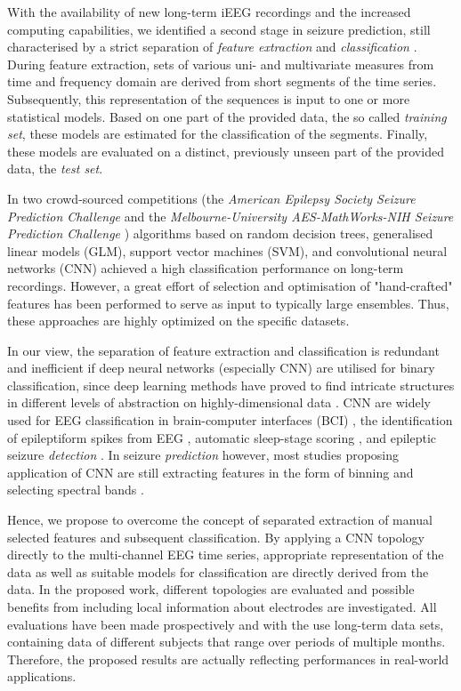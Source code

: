 \documentclass[a4paper, conference]{IEEEtran}
\begin{document}
With the availability of new long-term iEEG recordings and the increased computing capabilities, we identified a second stage in seizure prediction, still characterised by a strict separation of \textit{feature extraction} and \textit{classification} \cite{Howbert2014}. During feature extraction, sets of various uni- and multivariate measures from time and frequency domain are derived from short segments of the time series. Subsequently, this representation of the sequences is input to one or more statistical models. Based on one part of the provided data, the so called \textit{training set}, these models are estimated for the classification of the segments. Finally, these models are evaluated on a distinct, previously unseen part of the provided data, the \textit{test set}.

In two crowd-sourced competitions (the \textit{American Epilepsy Society Seizure Prediction Challenge} \cite{Brinkmann2016} and the \textit{Melbourne-University AES-MathWorks-NIH Seizure Prediction Challenge} \cite{Kuhlmann2018}) algorithms based on random decision trees, generalised linear models (GLM), support vector machines (SVM), and convolutional neural networks (CNN) achieved a high classification performance on long-term recordings. However, a great effort of selection and optimisation of "hand-crafted" features has been performed to serve as input to typically large ensembles. Thus, these approaches are highly optimized on the specific datasets. 

In our view, the separation of feature extraction and classification is redundant and inefficient if deep neural networks (especially CNN) are utilised for binary classification, since deep learning methods have proved to find intricate structures in different levels of abstraction on highly-dimensional data \cite{LeCun2015}. CNN are widely used for EEG classification in brain-computer interfaces (BCI) \cite{Lotte2018}, the identification of epileptiform spikes from EEG \cite{Johansen2016}, automatic sleep-stage scoring \cite{Tsinalis2016}, and epileptic seizure \textit{detection} \cite{Park2018}. In seizure \textit{prediction} however, most studies proposing application of CNN are still extracting features in the form of binning and selecting spectral bands \cite{Kiral-Kornek2018, Truong2018, Brinkmann2016}.

Hence, we propose to overcome the concept of separated extraction of manual selected features and subsequent classification. By applying a CNN topology directly to the multi-channel EEG time series, appropriate representation of the data as well as suitable models for classification are directly derived from the data.  In the proposed work, different topologies are evaluated and possible benefits from including local information about electrodes are investigated. All evaluations have been made prospectively and with the use long-term data sets, containing data of different subjects that range over periods of multiple months. Therefore, the proposed results are actually reflecting performances in real-world applications.
\end{document}
